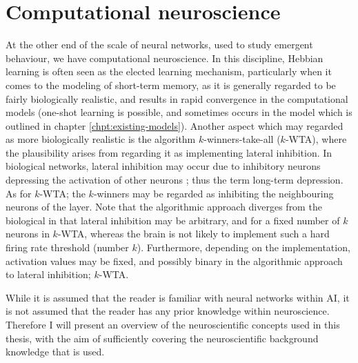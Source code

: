 \section{Computational neuroscience}

At the other end of the scale of neural networks, used to study emergent behaviour, we have computational neuroscience. In this discipline, Hebbian learning is often seen as the elected learning mechanism, particularly when it comes to the modeling of short-term memory, as it is generally regarded to be fairly biologically realistic, and results in rapid convergence in the computational models (one-shot learning is possible, and sometimes occurs in the model which is outlined in chapter \ref{chpt:existing-models}). 
Another aspect which may regarded as more biologically realistic is the algorithm $k$-winners-take-all ($k$-WTA), where the plausibility arises from regarding it as implementing lateral inhibition. In biological networks, lateral inhibition may occur due to inhibitory neurons depressing the activation of other neurons \citep{Rolls1998chpt1}; thus the term long-term depression. As for $k$-WTA; the $k$-winners may be regarded as inhibiting the neighbouring neurons of the layer. Note that the algorithmic approach diverges from the biological in that lateral inhibition may be arbitrary, and for a fixed number of $k$ neurons in $k$-WTA, whereas the brain is not likely to implement such a hard firing rate threshold (number $k$). Furthermore, depending on the implementation, activation values may be fixed, and possibly binary in the algorithmic approach to lateral inhibition; $k$-WTA.

While it is assumed that the reader is familiar with neural networks within AI, it is not assumed that the reader has any prior knowledge within neuroscience. Therefore I will present an overview of the neuroscientific concepts used in this thesis, with the aim of sufficiently covering the neuroscientific background knowledge that is used.
\\

